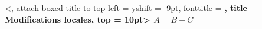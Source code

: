 \begin{tdoclatex}%
    [linenos, style = igor, showspaces]%
    <,
     attach boxed title to top left = {yshift = -9pt},
     fonttitle                      = \bfseries,
     title                          = Modifications locales,
     top                            = 10pt>
$A = B + C$
\end{tdoclatex}
